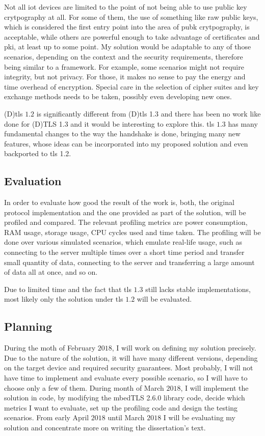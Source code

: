 \documentclass{llncs}
\begin{document}
Not all \gls{iot} devices are limited to the point of not being able to use
public key crytpography at all. For some of them, the use of something like raw
public keys, which is considered the first entry point into the area of \gls{pubk}
crytpography, is acceptable, while others are powerful enough to take
advantage of certificates and \gls{pki}, at least up to some point. My solution
would be adaptable to any of those scenarios, depending on the context and the security
requirements, therefore being similar to a framework. For example, some scenarios
might not require integrity, but not privacy. For those, it makes no sense to
pay the energy and time overhead of encryption. Special care in the
selection of cipher suites and key exchange methods needs to be taken, possibly even developing new ones.

(D)\gls{tls} $1.2$ is significantly different from (D)\gls{tls} 1.3
and there has been no work like \cite{RFC7924} done for (D)TLS 1.3
and it would be interesting to explore this. \gls{tls} $1.3$ has many fundamental changes
to the way the handshake is done, bringing many new features, whose ideas can
be incorporated into my proposed solution and even backported to \gls{tls} 1.2.

\subsection{Evaluation}

In order to evaluate how good the result of the work is, both, the original protocol
implementation and the one provided as part of the solution, will be profiled and compared. The relevant profiling metrics are power consumption, RAM usage, storage usage,
CPU cycles used and time taken. The profiling
will be done over various simulated scenarios, which emulate real-life usage,
such as connecting to the server multiple times over a short time period and transfer
small quantity of data, connecting to the server and transferring a large
amount of data all at once, and so on.

Due to limited time and the fact that \gls{tls} $1.3$ still lacks stable implementations, most likely only the solution under \gls{tls} $1.2$ will be evaluated.

\subsection{Planning}

During the moth of February $2018$, I will work on defining my solution precisely.
Due to the nature of the solution, it will have many different versions, depending
on the target device and required security guarantees. Most probably, I will not
have time to implement and evaluate every possible scenario, so I will have to choose
only a few of them.
During month of March $2018$, I will implement the solution in code, by modifying
the mbedTLS 2.6.0 library\cite{SSLLibra13:online} code, decide which metrics
I want to evaluate, set up the profiling code and design the testing scenarios.
From early April $2018$ until March $2018$ I will be evaluating my solution and
concentrate more on writing the dissertation's text.
\end{document}

